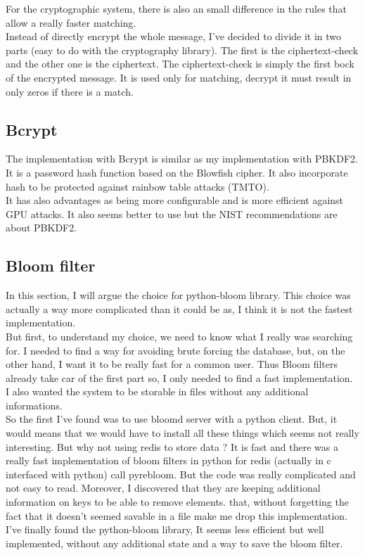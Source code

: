 \documentclass{eplmastersthesis}
\begin{document}
For the cryptographic system, there is also an small difference in the rules that allow a really faster matching.\\
Instead of directly encrypt the whole message, I've decided to divide it in two parts (easy to do with the cryptography library). The first is the ciphertext-check and the other one is the ciphertext. The ciphertext-check is simply the first bock of the encrypted message. It is used only for matching, decrypt it must result in only zeros if there is a match.

\subsection{Bcrypt}
The implementation with Bcrypt is similar as my implementation with PBKDF2. It is a password hash function based on the Blowfish cipher. It also incorporate hash to be protected against rainbow table attacks (TMTO).\\
It has also advantages as being more configurable and is more efficient against GPU attacks. It also seems better to use but the NIST recommendations are about PBKDF2.

\subsection{Bloom filter}
In this section, I will argue the choice for python-bloom library. This choice was actually a way more complicated than it could be as, I think it is not the fastest implementation.\\
But first, to understand my choice, we need to know what I really was searching for. I needed to find a way for avoiding brute forcing the database, but, on the other hand, I want it to be really fast for a common user. Thus Bloom filters already take car of the first part so, I only needed to find a fast implementation.\\
I also wanted the system to be storable in files without any additional informations.\\
So the first I've found was to use bloomd server with a python client. But, it would means that we would have to install all these things which seems not really interesting. But why not using redis to store data ? It is fast and there was a really fast implementation of bloom filters in python for redis (actually in c interfaced with python) call pyrebloom. But the code was really complicated and not easy to read. Moreover, I discovered that they are keeping additional information on keys to be able to remove elements. that, without forgetting the fact that it doesn't seemed savable in a file make me drop this implementation.\\
I've finally found the python-bloom library, It seems less efficient but well implemented, without any additional state and a way to save the bloom filter.\\
\end{document}
